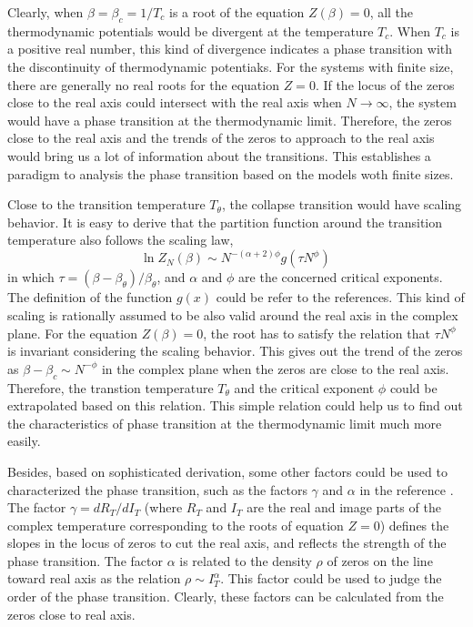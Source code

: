 \documentclass[preprint,preprintnumbers,amsmath,amssymb,showpacs,aps,pre]{revtex4-1}
\begin{document}
Clearly, when $\beta=\beta_c=1/T_c$ is a root of the equation $Z(\beta)=0$, all
the thermodynamic potentials would be divergent at the temperature $T_c$. When
$T_c$ is a positive real number, this kind of divergence indicates a phase
transition with the discontinuity of thermodynamic potentiaks. For the systems
with finite size, there are generally no real roots for the equation $Z=0$.
If the locus of the zeros close to the real axis could intersect with the
real axis when $N\rightarrow\infty$, the system would have a phase transition
at the thermodynamic limit. Therefore, the zeros close to the real axis and
the trends of the zeros to approach to the real axis would bring us a lot of
information about the transitions. This establishes a paradigm to analysis
the phase transition based on the models woth finite sizes.

Close to the transition temperature $T_{\theta}$, the collapse transition
would have scaling behavior. It is easy to derive that the partition
function around the transition temperature also follows the scaling law,
\begin{equation}
\ln Z_N(\beta) \sim N^{-(\alpha+2)\phi} g(\tau N^{\phi}) \,
\end{equation}
in which $\tau=(\beta-\beta_{\theta})/\beta_{\theta}$, and $\alpha$ and
$\phi$ are the concerned critical exponents. The definition of the function
$g(x)$ could be refer to the references\cite{ChangPRE93}. This kind of
scaling is rationally assumed to be also valid around the real axis in
the complex plane. For the equation $Z(\beta)=0$, the root has to satisfy
the relation that $\tau N^{\phi}$ is invariant considering the scaling
behavior. This gives out the trend of the zeros as 
$\beta-\beta_c \sim N^{-\phi}$ in the complex plane when the zeros are
close to the real axis. Therefore, the
transtion temperature $T_{\theta}$ and the critical exponent $\phi$ could be
extrapolated based on this relation. This simple relation could help us to
find out the characteristics of phase transition at the thermodynamic limit
much more easily.

Besides, based on sophisticated derivation, some other factors could be used
to characterized the phase transition, such as the factors $\gamma$ and
$\alpha$ in the reference \cite{WangJCP03}. The factor $\gamma=d R_T/d I_T$
(where $R_T$ and $I_T$ are the real and image parts of the complex temperature
corresponding to the roots of equation $Z=0$) defines the slopes in the locus
of zeros to cut the real axis, and reflects the strength of the phase
transition. The factor $\alpha$ is related to the density $\rho$ of zeros on the line
toward real axis as the relation $\rho \sim I_T^{\alpha}$. This factor could
be used to judge the order of the phase transition. Clearly, these factors can
be calculated from the zeros close to real axis.
\end{document}
